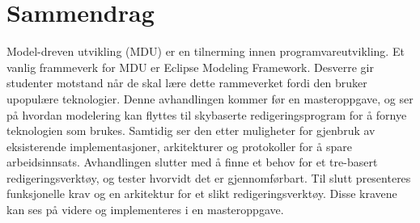 \chapter*{Sammendrag}

Model-dreven utvikling (MDU) er en tilnerming innen programvareutvikling.
Et vanlig frammeverk for MDU er Eclipse Modeling Framework.
Desverre gir studenter motstand når de skal lære dette rammeverket fordi den bruker upopulære teknologier.
Denne avhandlingen kommer før en masteroppgave, og ser på hvordan modelering kan flyttes til skybaserte redigeringsprogram for å fornye teknologien som brukes.
Samtidig ser den etter muligheter for gjenbruk av eksisterende implementasjoner, arkitekturer og protokoller for å spare arbeidsinnsats.
Avhandlingen slutter med å finne et behov for et tre-basert redigeringsverktøy, og tester hvorvidt det er gjennomførbart.
Til slutt presenteres funksjonelle krav og en arkitektur for et slikt redigeringsverktøy.
Disse kravene kan ses på videre og implementeres i en masteroppgave. 
